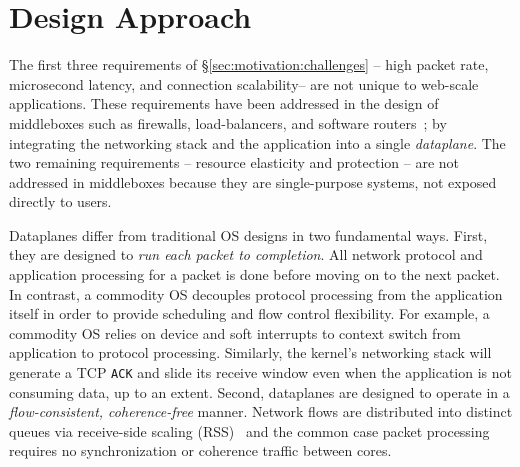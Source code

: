 \section{\ix Design Approach}
\label{sec:design}


The first three requirements of \S\ref{sec:motivation:challenges} --
high packet rate, microsecond latency, and connection scalability--
are not unique to web-scale applications.  These requirements have
been addressed in the design of middleboxes such as firewalls,
load-balancers, and software
routers~\cite{DBLP:journals/tocs/KohlerMCJK00,DBLP:conf/sosp/DobrescuEACFIKMR09};
by integrating the networking stack and the application into a single
\emph{dataplane}. The two remaining requirements -- resource
elasticity and protection -- are not addressed in middleboxes because
they are single-purpose systems, not exposed directly to users.


Dataplanes differ from traditional OS designs in two fundamental
ways. First, they are designed to \emph{run each packet to
  completion}. All network protocol and application processing for a
packet is done before moving on to the next packet.  In contrast, a
commodity OS decouples protocol processing from the application itself
in order to provide scheduling and flow control flexibility.  For
example, a commodity OS relies on device and soft interrupts to
context switch from application to protocol processing. Similarly, the
kernel's networking stack will generate a TCP \texttt{ACK} and slide
its receive window even when the application is not consuming data, up
to an extent. Second, dataplanes are designed to operate in a
\emph{flow-consistent, coherence-free} manner.  Network flows are
distributed into distinct queues via receive-side scaling
(RSS)~\cite{url:rss} and the common case packet processing requires no
synchronization or coherence traffic between cores.

